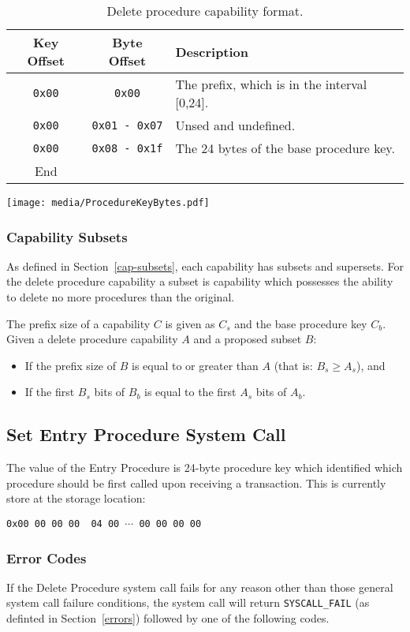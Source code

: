 \documentclass[english,a4paper]{article}
\let\oldparagraph\subsubsection
\renewcommand{\subsubsection}[1]{\oldparagraph{#1}\mbox{}}
\begin{document}
\begin{table}[H]
  \caption{Delete procedure capability format.}
  \centering{}%
  \begin{tabularx}{\textwidth}{c|c|X}
    \hline
    Key Offset & Byte Offset & Description \\
    \hline
    \hline
    \texttt{0x00} & \texttt{0x00} & The prefix, which is in the interval [0,24]. \\
    \texttt{0x00} & \texttt{0x01 - 0x07} & Unsed and undefined. \\
    \texttt{0x00} & \texttt{0x08 - 0x1f} & The 24 bytes of the base procedure key. \\
    \hline
    End &   \\
    \hline
  \end{tabularx}
\end{table}

\texttt{[image: media/ProcedureKeyBytes.pdf]}

\subsubsection{Capability Subsets}
As defined in Section~\ref{cap-subsets}, each capability has subsets and
supersets. For the delete procedure capability a subset is capability which
possesses the ability to delete no more procedures than the original.

The prefix size of a capability $C$ is given as $C_s$ and the base procedure key
$C_b$. Given a delete procedure capability $A$ and a proposed subset $B$:
\begin{itemize}
  \item If the prefix size of $B$ is equal to or greater than $A$ (that is: $B_s
  \geq A_s$), and
  \item If the first $B_s$ bits of $B_b$ is equal to the first $A_s$ bits of
  $A_b$.
\end{itemize}

\subsection{Set Entry Procedure System Call}
The value of the Entry Procedure is 24-byte procedure key which identified which
procedure should be first called upon receiving a transaction. This is currently
store at the storage location:

\texttt{0x00 00 00 00 {\color{blue} 04} 00 $\cdots$ 00 00 00 00}

\subsubsection{Error Codes}
If the Delete Procedure system call fails for any reason other than those
general system call failure conditions, the system call will return
\texttt{SYSCALL\_FAIL} (as definted in Section~\ref{errors}) followed by one of
the following codes.
\end{document}
